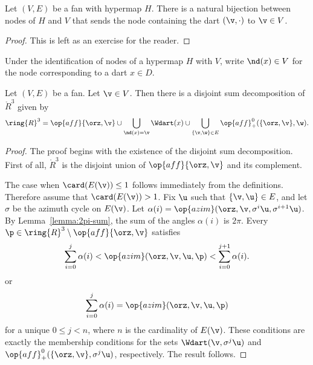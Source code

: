 
\begin{lemma}[]\label{lemma:node-vertex}
Let $(V,E)$ be a fan with hypermap $H$.  There is a natural bijection between
nodes of $H$ and $V$ that sends the node containing the dart $(\v,\cdot)$
to $\v\in V$.
\end{lemma}

\begin{proof}  This is left as an exercise for the reader.
\end{proof}

\begin{definition}[$\nd$]
Under the identification of nodes of a hypermap $H$ with $V$,
write $\nd(x)\in V$ for the node corresponding to a dart $x\in D$. 
\end{definition}

\begin{lemma}[]\label{lemma:disjoint}
Let $(V,E)$ be a fan.  Let $\v\in V$.  
Then
there is a disjoint sum decomposition of $\ring{R}^3$ given by
\begin{displaymath}
\ring{R}^3 = 
\op{aff}\{\orz,\v\} \cup
\bigcup_{\nd(x)=\v} \Wdart(x)  \cup 
\bigcup_{\{\v,\w\}\in E} \op{aff}_+^0(\{\orz,\v\},\w).
\end{displaymath}
\end{lemma}
%
%
%





\begin{proof}
The proof begins with the existence of the disjoint sum decomposition.
First of all, $\ring{R}^3$ is the disjoint union of $\op{aff}\{\orz,\v\}$
and its complement.

The case when $\card(E(\v))\le 1$ follows immediately from the
definitions.  Therefore assume that $\card(E(\v)) >1$.  Fix $\u$ such
that $\{\v,\u\}\in E$, and let $\sigma$ be the azimuth cycle on
$E(\v)$.  Let $\alpha(i)=\op{azim}(\orz,\v,\sigma^i
\u,\sigma^{i+1}\u)$.  By Lemma~\ref{lemma:2pi-sum}, the sum of the
angles $\alpha(i)$ is $2\pi$.  Every
$\p\in\ring{R}^3\setminus\op{aff}\{\orz,\v\}$ satisfies
\begin{displaymath}
\sum_{i=0}^j \alpha(i) <
\op{azim}(\orz,\v,\u,\p) < \sum_{i=0}^{j+1} \alpha(i).
\end{displaymath}
or 
\begin{displaymath}
\sum_{i=0}^j \alpha(i) = \op{azim}(\orz,\v,\u,\p)
\end{displaymath}
for a unique $0 \le j < n$, where $n$ is the cardinality of $E(\v)$. 
These conditions are exactly the membership conditions for the sets
$
\Wdart(\v,\sigma^j \u)
$
and $\op{aff}_+^0(\{\orz,\v\},\sigma^j \u)$, respectively.
The result follows.
\end{proof}

